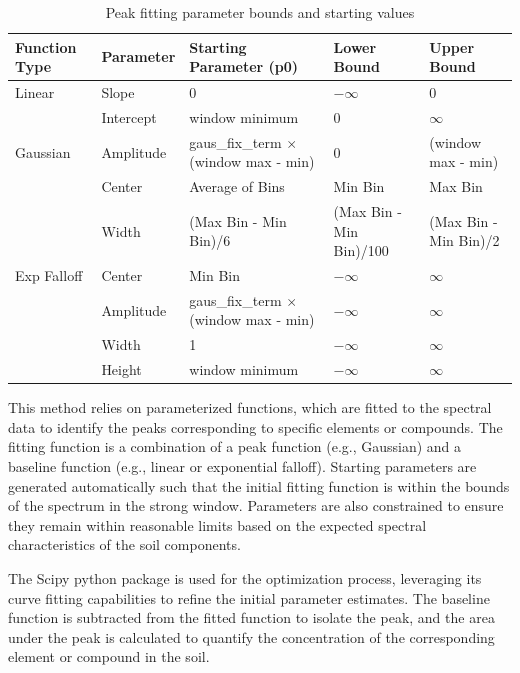 \documentclass[review]{elsarticle}
\begin{document}
\begin{table}[H]
\centering
\caption{Peak fitting parameter bounds and starting values}
\label{tab:peak_param_bounds}
\begin{tabular}{@{}lllll@{}}
\toprule
Function Type & Parameter & Starting Parameter (p0) & Lower Bound & Upper Bound \\
\midrule
Linear & Slope & 0 & $-\infty$ & 0 \\
 & Intercept & window minimum & 0 & $\infty$ \\
Gaussian & Amplitude & gaus\_fix\_term $\times$ (window max - min) & 0 & (window max - min) \\
 & Center & Average of Bins & Min Bin & Max Bin \\
 & Width & (Max Bin - Min Bin)/6 & (Max Bin - Min Bin)/100 & (Max Bin - Min Bin)/2 \\
Exp Falloff & Center & Min Bin & $-\infty$ & $\infty$ \\
 & Amplitude & gaus\_fix\_term $\times$ (window max - min) & $-\infty$ & $\infty$ \\
 & Width & 1 & $-\infty$ & $\infty$ \\
 & Height & window minimum & $-\infty$ & $\infty$ \\
\bottomrule
\end{tabular}
\end{table}

This method relies on parameterized functions, which are fitted to the spectral data to identify the peaks corresponding to specific elements or compounds. The fitting function is a combination of a peak function (e.g., Gaussian) and a baseline function (e.g., linear or exponential falloff). Starting parameters are generated automatically such that the initial fitting function is within the bounds of the spectrum in the strong window. Parameters are also constrained to ensure they remain within reasonable limits based on the expected spectral characteristics of the soil components.

The Scipy python package is used for the optimization process, leveraging its curve fitting capabilities to refine the initial parameter estimates. The baseline function is subtracted from the fitted function to isolate the peak, and the area under the peak is calculated to quantify the concentration of the corresponding element or compound in the soil.
\end{document}
